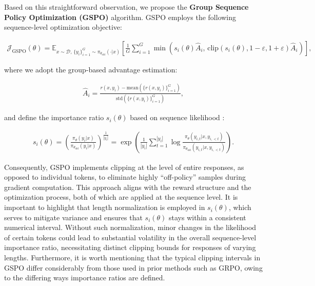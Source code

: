 Based on this straightforward observation, we propose the \textbf{Group Sequence Policy Optimization (GSPO)} algorithm. GSPO employs the following sequence-level optimization objective:

\begin{align}
\mathcal{J}_\text{GSPO} (\theta) =
\mathbb{E}_{ x \sim \mathcal{D},\, \{y_i\}_{i=1}^G \sim \pi_{\theta_\text{old}}( \cdot | x) }
\left[ 
\frac{1}{G} \sum_{i=1}^{G}
\min \left( s_{i}(\theta)  \widehat{A}_{i},  \, \mathrm{clip} \left( s_{i}(\theta), 1 - {\varepsilon}, 1 + {\varepsilon} \right) \widehat{A}_{i} \right) 
\right],
\label{equ:gspo}
\end{align}

where we adopt the group-based advantage estimation:

\begin{align}
\widehat{A}_{i} = \frac{r(x, y_i) - \mathrm{mean} \left( \{ r(x, y_i) \}_{i=1}^G \right) }{ \mathrm{std} \left( \{ r(x, y_i) \}_{i=1}^G \right) },
\end{align}

and define the importance ratio $s_{i}(\theta)$ based on sequence likelihood \citep{click}:

\begin{align}
s_{i}(\theta) = \left( \frac{ \pi_{\theta} (y_i | x) }{ \pi_{\theta_\text{old}} (y_i | x)} \right)^{\frac{1}{|y_i|}}
=
\exp \left( \frac{1}{|y_i|} \sum_{t=1}^{|y_i|} \log \frac{ \pi_{\theta} (y_{i,t} | x, y_{i,<t}) }{ \pi_{\theta_\text{old}} (y_{i,t} | x,y_{i,<t})} \right).
\end{align}

Consequently, GSPO implements clipping at the level of entire responses, as opposed to individual tokens, to eliminate highly ``off-policy'' samples during gradient computation. This approach aligns with the reward structure and the optimization process, both of which are applied at the sequence level. It is important to highlight that length normalization is employed in $s_{i}(\theta)$, which serves to mitigate variance and ensures that $s_{i}(\theta)$ stays within a consistent numerical interval. Without such normalization, minor changes in the likelihood of certain tokens could lead to substantial volatility in the overall sequence-level importance ratio, necessitating distinct clipping bounds for responses of varying lengths. Furthermore, it is worth mentioning that the typical clipping intervals in GSPO differ considerably from those used in prior methods such as GRPO, owing to the differing ways importance ratios are defined.

